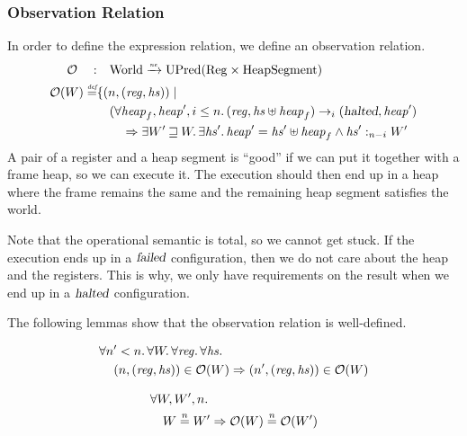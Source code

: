 \documentclass{article}
\newcommand{\nefun}{\xrightarrow{\textit{\tiny{ne}}}}
\newcommand{\defeq}{\stackrel{\textit{\tiny{def}}}{=}}
\newcommand{\nequal}[1][n]{\stackrel{\tiny{#1}}{=}}
\newcommand{\var}[1]{\mathit{#1}}
\newcommand{\hs}{\var{hs}}
\newcommand{\reg}{\var{reg}}
\newcommand{\heap}{\var{heap}}
\newcommand{\failed}{\textsl{failed}}
\newcommand{\halted}{\textsl{halted}}
\newcommand{\future}{\mathbin{\sqsupseteq}}
\newcommand{\heapSat}[3][\heap]{#1 :_{#2} #3}
\newcommand{\plaindom}[1]{\mathrm{#1}}
\newcommand{\Regs}{\plaindom{Reg}}
\newcommand{\HeapSegments}{\plaindom{HeapSegment}}
\newcommand{\Worlds}{\plaindom{World}}
\newcommand{\UPred}[1]{\plaindom{UPred}(#1)}
\newcommand{\observations}{\mathcal{O}}
\newcommand{\npair}[2][n]{\left(#1,#2 \right)}
\newcommand{\step}[1][]{\rightarrow_{#1}}
\begin{document}
\subsubsection{Observation Relation}
\label{subsubsec:observation-relation}
In order to define the expression relation, we define an observation relation.
\begin{align*}
  \observations \quad : & \quad  \Worlds \nefun \UPred{\Regs \times \HeapSegments} \\
  \observations (W) \defeq & \{ \npair{(\reg,\hs)} \mid \\
                           & \quad (\forall \heap_f, \heap', i \leq n \ldotp (\reg,\hs \uplus \heap_f) \step[i] (\halted,\heap')  \\
                           & \qquad \Rightarrow \exists W' \future W \ldotp\exists \hs' \ldotp \heap' = \hs' \uplus \heap_f \land \heapSat[\hs']{n-i}{W'}
\end{align*}
A pair of a register and a heap segment is ``good'' if we can put it together with a frame heap, so we can execute it. The execution should then end up in a heap where the frame remains the same and the remaining heap segment satisfies the world.

Note that the operational semantic is total, so we cannot get stuck. If the execution ends up in a $\failed$ configuration, then we do not care about the heap and the registers. This is why, we only have requirements on the result when we end up in a $\halted$ configuration.

The following lemmas show that the observation relation is well-defined.
\begin{lemma}
\label{lem:obs-dc}
  \begin{align*}
    &\forall n' < n \ldotp \forall W \ldotp \forall \reg \ldotp \forall \hs \ldotp\\
    &\quad \npair{(\reg,\hs)} \in \observations(W) \Rightarrow \npair[n']{(\reg,\hs)} \in \observations(W)
  \end{align*}
\end{lemma}

\begin{lemma}
\label{lem:obs-ne-worlds}
\begin{align*}
  &\forall W, W', n \ldotp \\
  &\quad W \nequal W' \Rightarrow \observations(W) \nequal \observations(W')
\end{align*}
\end{lemma}
\end{document}
